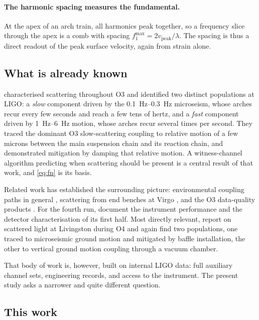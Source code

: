 \paragraph{The harmonic spacing measures the fundamental.} At the apex of an
arch train, all harmonics peak together, so a frequency slice through the apex
is a comb with spacing $f_1^{\max} = 2 v_{\mathrm{peak}}/\lambda$. The spacing
is thus a direct readout of the peak surface velocity, again from strain alone.

\subsection{What is already known}

\citet{Soni2021Scattering} characterised scattering throughout O3 and
identified two distinct populations at LIGO: a \emph{slow} component driven by
the \SIrange{0.1}{0.3}{\hertz} microseism, whose arches recur every few
seconds and reach a few tens of hertz, and a \emph{fast} component driven by
\SIrange{1}{6}{\hertz} motion, whose arches recur several times per second.
They traced the dominant O3 slow-scattering coupling to relative motion of a
few microns between the main suspension chain and its reaction chain, and
demonstrated mitigation by damping that relative motion. A witness-channel
algorithm predicting when scattering should be present is a central result of
that work, and \cref{eq:fn} is its basis.

Related work has established the surrounding picture: environmental coupling
paths in general \citep{Nguyen2021}, scattering from end benches at Virgo
\citep{Was2021,Accadia2010}, and the O3 data-quality products
\citep{Davis2021}. For the fourth run, \citet{Capote2025} document the
instrument performance and \citet{Soni2024O4} the detector characterisation of
its first half. Most directly relevant, \citet{Nandi2026} report on scattered
light at Livingston during O4 and again find two populations, one traced to
microseismic ground motion and mitigated by baffle installation, the other to
vertical ground motion coupling through a vacuum chamber.

That body of work is, however, built on internal LIGO data: full auxiliary
channel sets, engineering records, and access to the instrument. The present
study asks a narrower and quite different question.

\subsection{This work}

